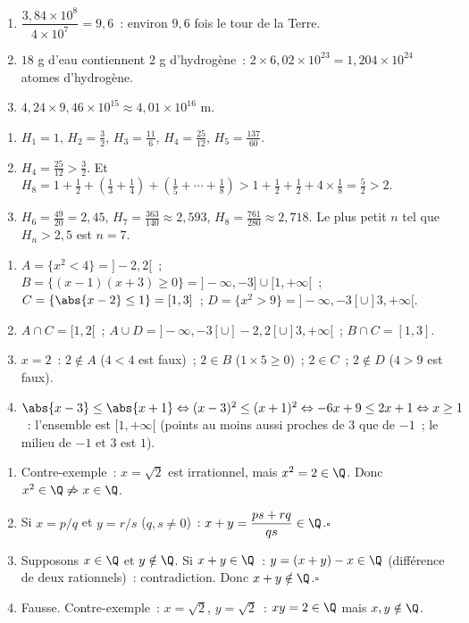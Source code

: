 \begin{enumerate}
  \item $\dfrac{3{,}84\times10^8}{4\times10^7}=9{,}6$~: environ $9{,}6$ fois le tour de la Terre.
  \item $18$ g d'eau contiennent $2$ g d'hydrog\`ene~: $2\times6{,}02\times10^{23}=1{,}204\times10^{24}$ atomes d'hydrog\`ene.
  \item $4{,}24\times9{,}46\times10^{15}\approx4{,}01\times10^{16}$ m.
\end{enumerate}
\begin{enumerate}
  \item $H_1=1$, $H_2=\tfrac32$, $H_3=\tfrac{11}{6}$, $H_4=\tfrac{25}{12}$, $H_5=\tfrac{137}{60}$.
  \item $H_4=\tfrac{25}{12}>\tfrac32$. Et $H_8=1+\tfrac12+(\tfrac13+\tfrac14)+(\tfrac15+\cdots+\tfrac18)>1+\tfrac12+\tfrac12+4\times\tfrac18=\tfrac52>2$.
  \item $H_6=\tfrac{49}{20}=2{,}45$, $H_7=\tfrac{363}{140}\approx2{,}593$, $H_8=\tfrac{761}{280}\approx2{,}718$.
        Le plus petit $n$ tel que $H_n>2{,}5$ est $n=7$.
\end{enumerate}
\begin{enumerate}
  \item $A=\{x^2<4\}=]-2,2[$~; $B=\{(x-1)(x+3)\ge0\}=]-\infty,-3]\cup[1,+\infty[$~;
        $C=\{\abs{x-2}\le1\}=[1,3]$~; $D=\{x^2>9\}=]-\infty,-3[\cup]3,+\infty[$.
  \item $A\cap C=[1,2[$~; $A\cup D=]-\infty,-3[\cup]-2,2[\cup]3,+\infty[$~; $B\cap C=[1,3]$.
  \item $x=2$~: $2\notin A$ ($4<4$ est faux)~; $2\in B$ ($1\times5\ge0$)~; $2\in C$~; $2\notin D$ ($4>9$ est faux).
  \item $\abs{x-3}\le\abs{x+1}\Leftrightarrow(x-3)^2\le(x+1)^2\Leftrightarrow-6x+9\le2x+1\Leftrightarrow x\ge1$~: l'ensemble est $[1,+\infty[$ (points au moins aussi proches de $3$ que de $-1$~; le milieu de $-1$ et $3$ est $1$).
\end{enumerate}

\begin{enumerate}
  \item Contre-exemple~: $x=\sqrt{2}$ est irrationnel, mais $x^2=2\in\Q$.
        Donc $x^2\in\Q\not\Rightarrow x\in\Q$.
  \item Si $x=p/q$ et $y=r/s$ ($q,s\ne0$)~:
        $x+y=\dfrac{ps+rq}{qs}\in\Q$.\hfill$\square$
  \item Supposons $x\in\Q$ et $y\notin\Q$.
        Si $x+y\in\Q$~: $y=(x+y)-x\in\Q$ (diff\'erence de deux rationnels)~:
        contradiction. Donc $x+y\notin\Q$.\hfill$\square$
  \item Fausse. Contre-exemple~: $x=\sqrt{2}$, $y=\sqrt{2}$~:
        $xy=2\in\Q$ mais $x,y\notin\Q$.
\end{enumerate}

